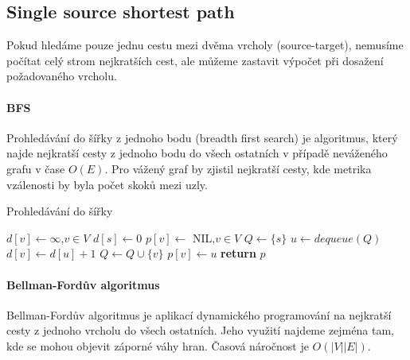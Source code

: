 \documentclass[12pt,titlepage]{report}
\begin{document}
\subsection{Single source shortest path}
Pokud hledáme pouze jednu cestu mezi dvěma vrcholy (source-target), nemusíme
počítat celý strom nejkratších cest, ale můžeme zastavit výpočet při dosažení
požadovaného vrcholu. 

\paragraph{BFS}
Prohledávání do šířky z jednoho bodu (breadth first search) je algoritmus,
který najde nejkratší cesty z jednoho bodu do všech ostatních v případě
neváženého grafu v čase $O(E)$. Pro vážený graf by zjistil nejkratší cesty, kde
metrika vzálenosti by byla počet skoků mezi uzly.

\begin{center}
\begin{minipage}{\textwidth}
\begin{algorithm}[H]
	\caption{Prohledávání do šířky}
		\label{alg:bfs}
	\begin{algorithmic}[1]
	\Statex
		\State $d[v] \gets \infty$,$v \in V$
		\State $d[s] \gets 0$
		\State $p[v] \gets $ NIL,$v \in V$
		\State $Q \gets \{s\}$
			\State $u \gets dequeue(Q)$
					\State $d[v] \gets d[u] + 1$
					\State $Q \gets Q \cup \{v\}$
					\State $p[v] \gets u$
				\EndIf
			\EndFor
		\EndWhile
		\State \textbf{return} $p$
	\EndFunction
	\end{algorithmic}
\end{algorithm}
\end{minipage}
\end{center}
\mbox{}

\paragraph{Bellman-Fordův algoritmus}
Bellman-Fordův algoritmus je aplikací dynamického programování na nejkratší
cesty z jednoho vrcholu do všech ostatních. Jeho využití najdeme zejména tam,
kde se mohou objevit záporné váhy hran. Časová náročnost je $O(|V||E|)$.
\end{document}

